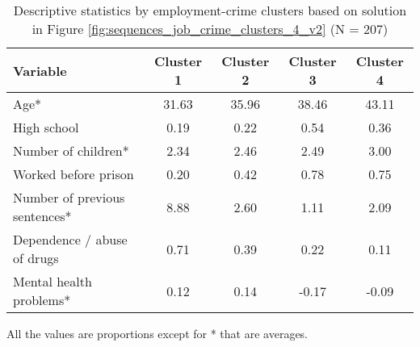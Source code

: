 \begin{table}[htp]
\footnotesize
\setlength{\tabcolsep}{10pt}
\renewcommand{\arraystretch}{1.3}
\begin{threeparttable}
\centering
\caption{Descriptive statistics by employment-crime clusters \newline based on solution in Figure \ref{fig:sequences_job_crime_clusters_4_v2} (N = 207)} 
\label{tab:descriptive_job_crime_clusters_4}
\begin{tabular}{lcccc}
  \hline
Variable & Cluster 1 & Cluster 2 & Cluster 3 & Cluster 4 \\ 
  \hline
Age* & 31.63 & 35.96 & 38.46 & 43.11 \\ 
  High school & 0.19 & 0.22 & 0.54 & 0.36 \\ 
  Number of children* & 2.34 & 2.46 & 2.49 & 3.00 \\ 
  Worked before prison & 0.20 & 0.42 & 0.78 & 0.75 \\ 
  Number of previous sentences* & 8.88 & 2.60 & 1.11 & 2.09 \\ 
  Dependence / abuse of drugs & 0.71 & 0.39 & 0.22 & 0.11 \\ 
  Mental health problems* & 0.12 & 0.14 & -0.17 & -0.09 \\ 
   \hline
\end{tabular}
\begin{tablenotes}
\scriptsize
\item All the values are proportions except for * that are averages.
\end{tablenotes}
\end{threeparttable}
\end{table}
